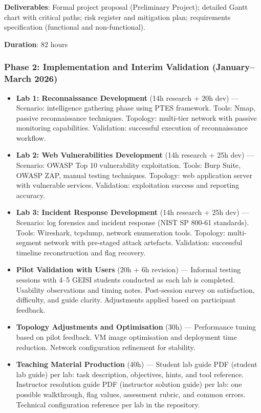 \textbf{Deliverables}: Formal project proposal (Preliminary Project); detailed Gantt chart with critical paths; risk register and mitigation plan; requirements specification (functional and non-functional).

\textbf{Duration}: 82 hours

\subsubsection{Phase 2: Implementation and Interim Validation (January--March 2026)}

\begin{itemize}
\item
  \textbf{Lab 1: Reconnaissance Development} (14h research + 20h dev) --- Scenario: intelligence gathering phase using PTES framework. Tools: Nmap, passive reconnaissance techniques. Topology: multi-tier network with passive monitoring capabilities. Validation: successful execution of reconnaissance workflow.
\item
  \textbf{Lab 2: Web Vulnerabilities Development} (14h research + 25h dev) --- Scenario: OWASP Top 10 vulnerability exploitation. Tools: Burp Suite, OWASP ZAP, manual testing techniques. Topology: web application server with vulnerable services. Validation: exploitation success and reporting accuracy.
\item
  \textbf{Lab 3: Incident Response Development} (14h research + 25h dev) --- Scenario: log forensics and incident response (NIST SP 800-61 standards). Tools: Wireshark, tcpdump, network enumeration tools. Topology: multi-segment network with pre-staged attack artefacts. Validation: successful timeline reconstruction and flag recovery.
\item
  \textbf{Pilot Validation with Users} (20h + 6h revision) --- Informal testing sessions with 4--5 GEISI students conducted as each lab is completed. Usability observations and timing notes. Post-session survey on satisfaction, difficulty, and guide clarity. Adjustments applied based on participant feedback.
\item
  \textbf{Topology Adjustments and Optimisation} (30h) --- Performance tuning based on pilot feedback. VM image optimisation and deployment time reduction. Network configuration refinement for stability.
\item
  \textbf{Teaching Material Production} (40h) --- Student lab guide PDF (student lab guide) per lab: task description, objectives, hints, and tool reference. Instructor resolution guide PDF (instructor solution guide) per lab: one possible walkthrough, flag values, assessment rubric, and common errors. Technical configuration reference per lab in the repository.
\end{itemize}

